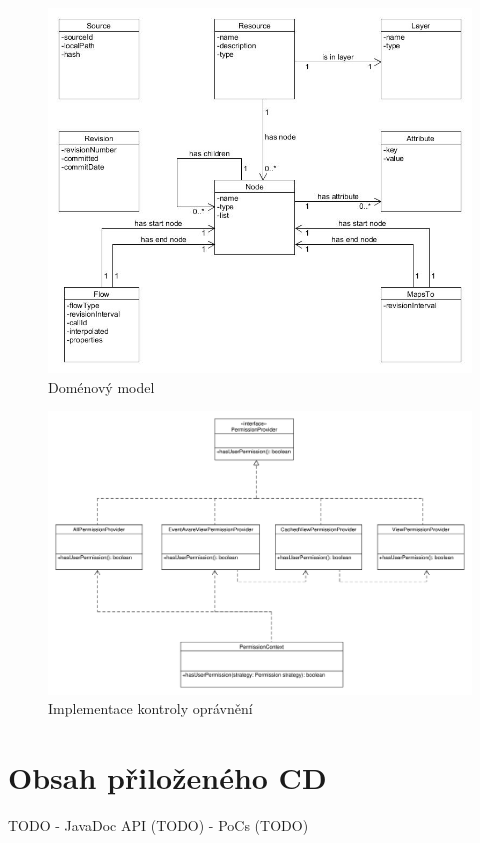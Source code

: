 \documentclass[11pt,twoside,a4paper]{book}
\begin{document}
\begin{figure}
\begin{center}
\includegraphics[width=14cm]{figures/domain_model}
\caption{Doménový model}
\label{fig:impl-domain}
\end{center}
\end{figure}

\begin{figure}
\begin{center}
\includegraphics[width=14cm]{figures/permission-class}
\caption{Implementace kontroly oprávnění} %
\label{fig:impl-permission}
\end{center}
\end{figure}

\chapter{Obsah přiloženého CD}
\label{apx:cd}
TODO
- JavaDoc API (TODO)
- PoCs (TODO)
\end{document}
